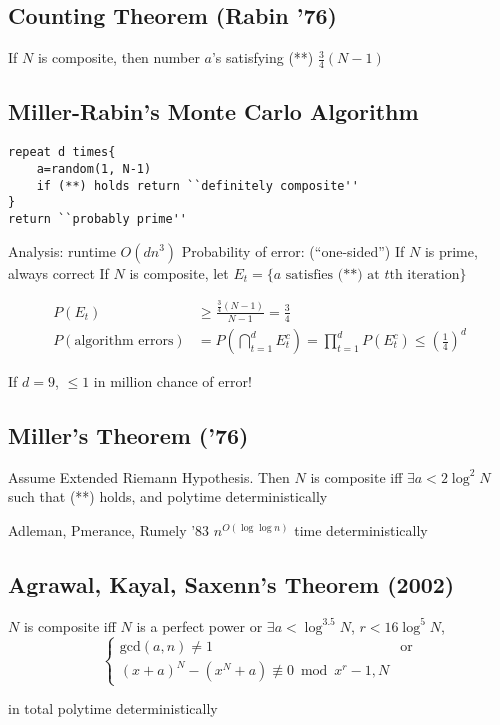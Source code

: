 \documentclass[english,12pt]{article}
\theoremstyle{plain}
\theoremstyle{definition}
\theoremstyle{definition} %
\begin{document}
\subsection{Counting Theorem (Rabin '76)}
If $N$ is composite, then number $a$'s satisfying (**) $\frac{3}{4}(N-1)$

\subsection{Miller-Rabin's Monte Carlo Algorithm}
\begin{verbatim}
repeat d times{
    a=random(1, N-1)
    if (**) holds return ``definitely composite''
}
return ``probably prime''
\end{verbatim}

Analysis: runtime $O(dn^3)$
Probability of error: (``one-sided'')
If $N$ is prime, always correct
If $N$ is composite, let $E_t=\{a\text{ satisfies (**) at }t\text{th iteration}\}$

\begin{align*}
P(E_t)&\ge \frac{\frac{3}{4}(N-1)}{N-1}
=\frac{3}{4}\\
P(\text{algorithm errors})&=P\left(\bigcap_{t=1}^dE_t^c\right)
=\prod_{t=1}^dP(E_t^c)
\le \left(\frac{1}{4}\right)^d
\end{align*}

If $d=9$, $\le 1$ in million chance of error!

\subsection{Miller's Theorem ('76)}
Assume Extended Riemann Hypothesis.  Then $N$ is composite iff $\exists a < 2\log^2 N$ such that (**) holds, and polytime deterministically

Adleman, Pmerance, Rumely '83 $n^{O(\log\log n)}$ time deterministically

\subsection{Agrawal, Kayal, Saxenn's Theorem (2002)}
$N$ is composite iff $N$ is a perfect power or $\exists a <\log^{3.5}N$, $r < 16\log^5N$,
\[\begin{cases}
\text{gcd}(a,n)\ne 1 & \text{or}\\
(x+a)^N-(x^N+a)\not\equiv 0 \bmod x^r-1, N
\end{cases}\]

in total polytime deterministically
\end{document}
